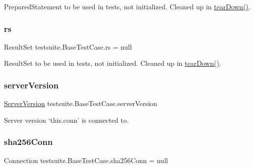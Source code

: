 Prepared\+Statement to be used in tests, not initialized. Cleaned up in \mbox{\hyperlink{classtestsuite_1_1_base_test_case_a51c7d76ab24b0c966f956250fd7a4f52}{tear\+Down()}}. \mbox{\label{classtestsuite_1_1_base_test_case_a31fa73417c178b2baaf37ef1362e37d9}} 
\subsubsection{\texorpdfstring{rs}{rs}}
{\footnotesize\ttfamily Result\+Set testsuite.\+Base\+Test\+Case.\+rs = null\hspace{0.3cm}{\ttfamily [protected]}}

Result\+Set to be used in tests, not initialized. Cleaned up in \mbox{\hyperlink{classtestsuite_1_1_base_test_case_a51c7d76ab24b0c966f956250fd7a4f52}{tear\+Down()}}. \mbox{\label{classtestsuite_1_1_base_test_case_a755284d3321cf420b44afe8b3d908bee}} 
\subsubsection{\texorpdfstring{server\+Version}{serverVersion}}
{\footnotesize\ttfamily \mbox{\hyperlink{classcom_1_1mysql_1_1cj_1_1_server_version}{Server\+Version}} testsuite.\+Base\+Test\+Case.\+server\+Version\hspace{0.3cm}{\ttfamily [protected]}}

Server version `this.\+conn' is connected to. \mbox{\label{classtestsuite_1_1_base_test_case_a5bd183a70ffca96d160794ac4a6250a4}} 
\subsubsection{\texorpdfstring{sha256\+Conn}{sha256Conn}}
{\footnotesize\ttfamily Connection testsuite.\+Base\+Test\+Case.\+sha256\+Conn = null\hspace{0.3cm}{\ttfamily [protected]}}

